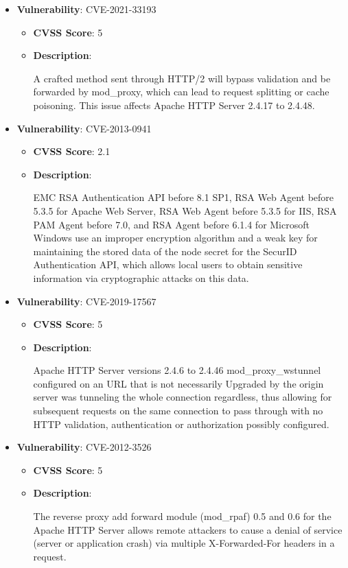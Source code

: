 \documentclass{article}
\begin{document}
\begin{itemize}
        \item \textbf{Vulnerability}: CVE-2021-33193
        \begin{itemize}
            \item \textbf{CVSS Score}:  5 
            \item \textbf{Description}:
            \parbox[t]{0.9\linewidth}{
                \ttfamily A crafted method sent through HTTP/2 will bypass validation and be forwarded by mod\_proxy, which can lead to request splitting or cache poisoning. This issue affects Apache HTTP Server 2.4.17 to 2.4.48.
            }
        \end{itemize}
    
        \item \textbf{Vulnerability}: CVE-2013-0941
        \begin{itemize}
            \item \textbf{CVSS Score}:  2.1 
            \item \textbf{Description}:
            \parbox[t]{0.9\linewidth}{
                \ttfamily EMC RSA Authentication API before 8.1 SP1, RSA Web Agent before 5.3.5 for Apache Web Server, RSA Web Agent before 5.3.5 for IIS, RSA PAM Agent before 7.0, and RSA Agent before 6.1.4 for Microsoft Windows use an improper encryption algorithm and a weak key for maintaining the stored data of the node secret for the SecurID Authentication API, which allows local users to obtain sensitive information via cryptographic attacks on this data.
            }
        \end{itemize}
    
        \item \textbf{Vulnerability}: CVE-2019-17567
        \begin{itemize}
            \item \textbf{CVSS Score}:  5 
            \item \textbf{Description}:
            \parbox[t]{0.9\linewidth}{
                \ttfamily Apache HTTP Server versions 2.4.6 to 2.4.46 mod\_proxy\_wstunnel configured on an URL that is not necessarily Upgraded by the origin server was tunneling the whole connection regardless, thus allowing for subsequent requests on the same connection to pass through with no HTTP validation, authentication or authorization possibly configured.
            }
        \end{itemize}
    
        \item \textbf{Vulnerability}: CVE-2012-3526
        \begin{itemize}
            \item \textbf{CVSS Score}:  5 
            \item \textbf{Description}:
            \parbox[t]{0.9\linewidth}{
                \ttfamily The reverse proxy add forward module (mod\_rpaf) 0.5 and 0.6 for the Apache HTTP Server allows remote attackers to cause a denial of service (server or application crash) via multiple X-Forwarded-For headers in a request.
            }
        \end{itemize}
    

\end{itemize}
\end{document}
